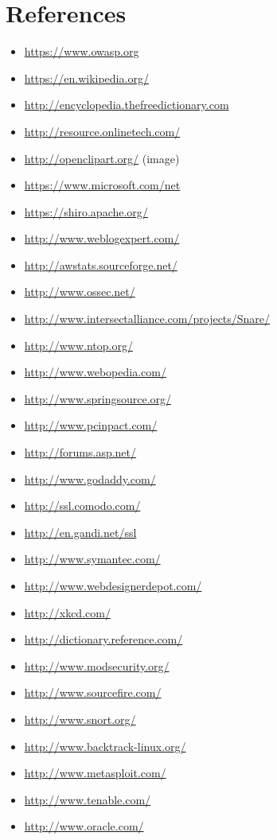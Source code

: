 \section*{References}
\begin{itemize}
\item \url{https://www.owasp.org}
\item \url{https://en.wikipedia.org/}
\item \url{http://encyclopedia.thefreedictionary.com}
\item \url{http://resource.onlinetech.com/}
\item \url{http://openclipart.org/} (image)
\item \url{https://www.microsoft.com/net}
\item \url{https://shiro.apache.org/}
\item \url{http://www.weblogexpert.com/}
\item \url{http://awstats.sourceforge.net/}
\item \url{http://www.ossec.net/}
\item \url{http://www.intersectalliance.com/projects/Snare/}
\item \url{http://www.ntop.org/}
\item \url{http://www.webopedia.com/}
\item \url{http://www.springsource.org/}
\item \url{http://www.pcinpact.com/}
\item \url{http://forums.asp.net/}
\item \url{http://www.godaddy.com/}
\item \url{http://ssl.comodo.com/}
\item \url{http://en.gandi.net/ssl}
\item \url{http://www.symantec.com/}
\item \url{http://www.webdesignerdepot.com/}
\item \url{http://xkcd.com/}
\item \url{http://dictionary.reference.com/}
\item \url{http://www.modsecurity.org/}
\item \url{http://www.sourcefire.com/}
\item \url{http://www.snort.org/}
\item \url{http://www.backtrack-linux.org/}
\item \url{http://www.metasploit.com/}
\item \url{http://www.tenable.com/}
\item \url{http://www.oracle.com/}

\end{itemize}
